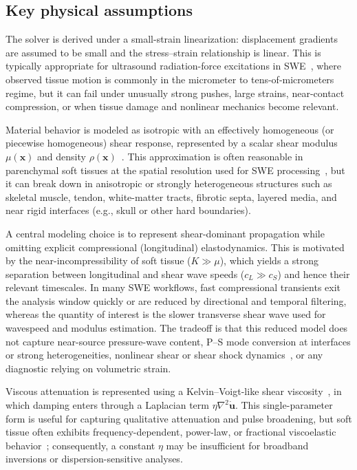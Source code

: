 \documentclass[11pt]{article}
\begin{document}
\subsection{Key physical assumptions}
The solver is derived under a small-strain linearization: displacement gradients are
assumed to be small and the stress--strain relationship is linear. This is typically
appropriate for ultrasound radiation-force excitations in SWE~\cite{sarvazyan1998elasticity,barr2015elastography}, where observed tissue
motion is commonly in the micrometer to tens-of-micrometers regime, but it can fail
under unusually strong pushes, large strains, near-contact compression, or when
tissue damage and nonlinear mechanics become relevant.

Material behavior is modeled as isotropic with an effectively homogeneous (or
piecewise homogeneous) shear response, represented by a scalar shear modulus
$\mu(\bm{x})$ and density $\rho(\bm{x})$~\cite{fung1993biomechanics,duck1990physical}. This approximation is often reasonable in
parenchymal soft tissues at the spatial resolution used for SWE processing~\cite{gennisson2013ultrasound}, but it
can break down in anisotropic or strongly heterogeneous structures such as skeletal
muscle, tendon, white-matter tracts, fibrotic septa, layered media, and near rigid
interfaces (e.g., skull or other hard boundaries).

A central modeling choice is to represent shear-dominant propagation while omitting
explicit compressional (longitudinal) elastodynamics. This is motivated by the
near-incompressibility of soft tissue ($K\gg\mu$), which yields a strong separation
between longitudinal and shear wave speeds ($c_L\gg c_S$) and hence their relevant
timescales. In many SWE workflows, fast compressional transients exit the analysis
window quickly or are reduced by directional and temporal filtering, whereas the
quantity of interest is the slower transverse shear wave used for wavespeed and
modulus estimation. The tradeoff is that this reduced model does not capture
near-source pressure-wave content, P--S mode conversion at interfaces or strong
heterogeneities, nonlinear shear or shear shock dynamics~\cite{tripathi2017shearshock,espindola2017shearshock,tripathi2019shearshock2d}, or any diagnostic relying on volumetric strain.

Viscous attenuation is represented using a Kelvin--Voigt-like shear viscosity~\cite{catheline2004viscoelastic,ferry1980viscoelasticity}, in
which damping enters through a Laplacian term $\eta\nabla^2\dot{\bm{u}}$. This
single-parameter form is useful for capturing qualitative attenuation and pulse
broadening, but soft tissue often exhibits frequency-dependent, power-law, or
fractional viscoelastic behavior~\cite{urban2012review}; consequently, a constant $\eta$ may be
insufficient for broadband inversions or dispersion-sensitive analyses.
\end{document}
